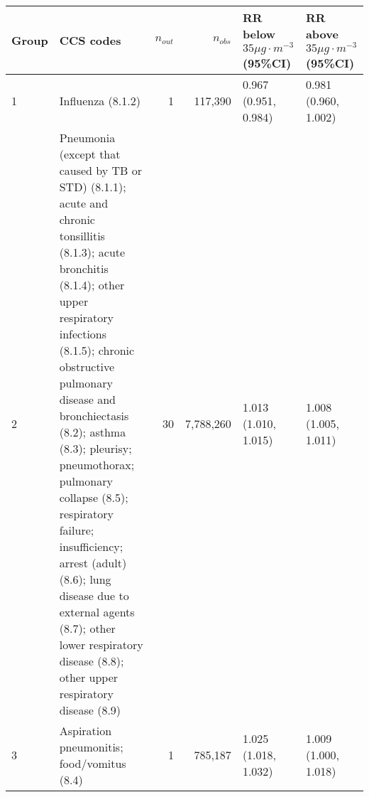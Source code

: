 \begin{tabular}{lp{6.5cm}rrp{2.2cm}p{2.2cm}}
  \hline
Group & CCS codes & $n_{out}$ & $n_{obs}$ & RR below $35 \mu g \cdot m^{-3}$ (95\%CI) & RR above $35 \mu g \cdot m^{-3}$ (95\%CI) \\ 
  \hline
   1 & Influenza (8.1.2) &    1 & 117,390 & 0.967 (0.951, 0.984) & 0.981 (0.960, 1.002) \\ 
     2 & Pneumonia (except that caused by TB or STD) (8.1.1); acute and chronic tonsillitis (8.1.3); acute bronchitis (8.1.4); other upper respiratory infections (8.1.5); chronic obstructive pulmonary disease and bronchiectasis (8.2); asthma (8.3); pleurisy; pneumothorax; pulmonary collapse (8.5); respiratory failure; insufficiency; arrest (adult) (8.6); lung disease due to external agents (8.7); other lower respiratory disease (8.8); other upper respiratory disease (8.9) &   30 & 7,788,260 & 1.013 (1.010, 1.015) & 1.008 (1.005, 1.011) \\ 
     3 & Aspiration pneumonitis; food/vomitus (8.4) &    1 & 785,187 & 1.025 (1.018, 1.032) & 1.009 (1.000, 1.018) \\ 
   \hline
\end{tabular}

